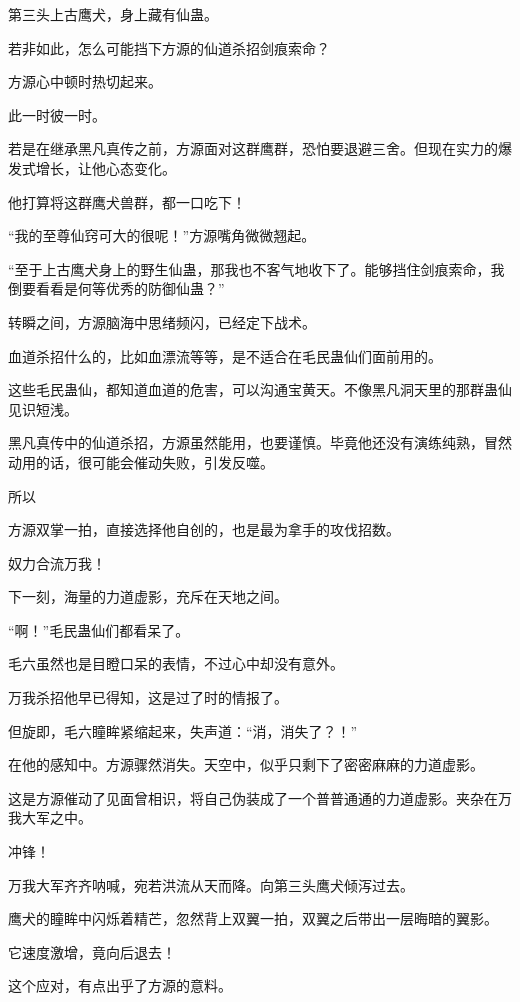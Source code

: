 
\begin{this_body}

第三头上古鹰犬，身上藏有仙蛊。

若非如此，怎么可能挡下方源的仙道杀招剑痕索命？

方源心中顿时热切起来。

此一时彼一时。

若是在继承黑凡真传之前，方源面对这群鹰群，恐怕要退避三舍。但现在实力的爆发式增长，让他心态变化。

他打算将这群鹰犬兽群，都一口吃下！

“我的至尊仙窍可大的很呢！”方源嘴角微微翘起。

“至于上古鹰犬身上的野生仙蛊，那我也不客气地收下了。能够挡住剑痕索命，我倒要看看是何等优秀的防御仙蛊？”

转瞬之间，方源脑海中思绪频闪，已经定下战术。

血道杀招什么的，比如血漂流等等，是不适合在毛民蛊仙们面前用的。

这些毛民蛊仙，都知道血道的危害，可以沟通宝黄天。不像黑凡洞天里的那群蛊仙见识短浅。

黑凡真传中的仙道杀招，方源虽然能用，也要谨慎。毕竟他还没有演练纯熟，冒然动用的话，很可能会催动失败，引发反噬。

所以

方源双掌一拍，直接选择他自创的，也是最为拿手的攻伐招数。

奴力合流万我！

下一刻，海量的力道虚影，充斥在天地之间。

“啊！”毛民蛊仙们都看呆了。

毛六虽然也是目瞪口呆的表情，不过心中却没有意外。

万我杀招他早已得知，这是过了时的情报了。

但旋即，毛六瞳眸紧缩起来，失声道：“消，消失了？！”

在他的感知中。方源骤然消失。天空中，似乎只剩下了密密麻麻的力道虚影。

这是方源催动了见面曾相识，将自己伪装成了一个普普通通的力道虚影。夹杂在万我大军之中。

冲锋！

万我大军齐齐呐喊，宛若洪流从天而降。向第三头鹰犬倾泻过去。

鹰犬的瞳眸中闪烁着精芒，忽然背上双翼一拍，双翼之后带出一层晦暗的翼影。

它速度激增，竟向后退去！

这个应对，有点出乎了方源的意料。


\end{this_body}
